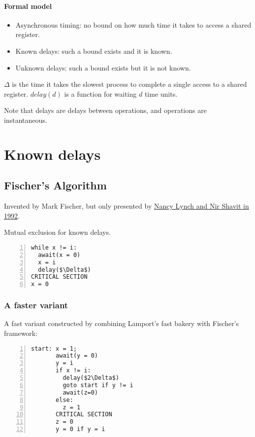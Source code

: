 \documentclass{idc_msc}
\begin{document}
\paragraph{Formal model}

\begin{itemize}
  \item Asynchronous timing: no bound on how much time it takes to access a shared register.
  \item Known delays: such a bound exists and it is known.
  \item Unknown delays: such a bound exists but it is not known.
\end{itemize}

$\Delta$ is the time it takes the slowest process to complete a single access to a shared register.
$delay(d)$ is a function for waiting $d$ time units.

Note that delays are delays between operations, and operations are instantaneous.


\clearpage
\section{Known delays}

\subsection{Fischer's Algorithm}

Invented by Mark Fischer, but only presented by \href{http://people.csail.mit.edu/shanir/publications/lynch92timingbased.pdf}{Nancy Lynch and Nir Shavit in 1992}.

Mutual exclusion for known delays.

\begin{lstlisting}[frame=L,mathescape=true,numbers=left,title={For process i in 1...n}]
while x != i:
  await(x = 0)
  x = i
  delay($\Delta$)
CRITICAL SECTION
x = 0
\end{lstlisting}

\subsubsection{A faster variant}

A fast variant constructed by combining Lamport's fast bakery with Fischer's framework:

\begin{lstlisting}[frame=L,mathescape=true,numbers=left,title={For process i in 1...n}]
start: x = 1;
       await(y = 0)
       y = i
       if x != i:
         delay($2\Delta$)
         goto start if y != i
         await(z=0)
       else:
         z = 1
       CRITICAL SECTION
       z = 0
       y = 0 if y = i
\end{lstlisting}
\end{document}
